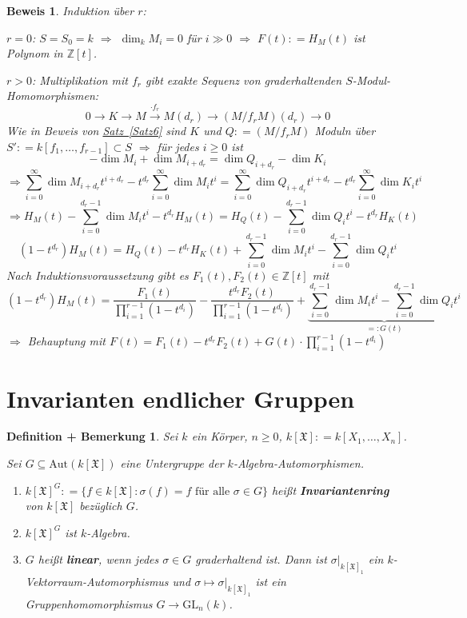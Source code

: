\documentclass[a4paper,12pt]{scrbook}
\theoremstyle{break}
\newtheorem{DefBem}[Def]{Definition + Bemerkung}
\theoremstyle{nonumberbreak}
\newtheorem{Bew}{Beweis}
\theoremstyle{nonumberplain}
\newcommand{\emp}[1]{\textbf{\emph{#1}}}
\newcommand{\defeqr}[0]{\mathrel{\mathop:}=}
\newcommand{\myref}[2]{%
\hyperref[#2]{#1~\ref*{#2}}%
}
\begin{document}
\begin{Bew}
  Induktion über $r$:

  $r=0$: $S = S_0 = k$ $\Rightarrow$ $\dim_k M_i = 0$ für $i \gg 0$
  $\Rightarrow$ $F(t) \defeqr H_M(t)$ ist Polynom in $\mathbb{Z}[t]$.

  $r>0$: Multiplikation mit $f_r$ gibt exakte Sequenz von graderhaltenden
  $S$-Modul-Homomorphismen:
  $$0 \to K \to M \overset{\cdot f_r}{\to} M(d_r) \to (M/f_r M)(d_r) \to 0$$
  Wie in Beweis von \myref{Satz}{Satz6} sind $K$ und $Q \defeqr (M/f_r M)$ Moduln
  über $S' \defeqr k[f_1, \dots, f_{r-1}] \subset S$ $\Rightarrow$ für jedes $i
  \ge 0$ ist
  $$ -\dim M_i + \dim M_{i + d_r} = \dim Q_{i+d_r} - \dim K_i$$
  $$\Rightarrow \sum_{i=0}^{\infty} \dim M_{i+d_r} t^{i+d_r} - t^{d_r}
  \sum_{i=0}^{\infty} \dim M_i t^i = \sum_{i=0}^{\infty} \dim
  Q_{i+d_r} t^{i+d_r} - t^{d_r} \sum_{i=0}^{\infty} \dim K_i t^i$$
  $$\Rightarrow H_M(t) - \sum_{i=0}^{d_r -1} \dim M_i t^i - t^{d_r} H_M(t)
  = H_Q(t) - \sum_{i=0}^{d_r - 1} \dim Q_i t^i - t^{d_r} H_K(t)$$
  $$(1 - t^{d_r})H_M(t) = H_Q(t) - t^{d_r} H_K(t) + \sum_{i=0}^{d_r-1} \dim M_i t^i - \sum_{i=0}^{d_r - 1} \dim Q_i t^i$$
  Nach Induktionsvoraussetzung gibt es $F_1(t), F_2(t) \in \mathbb{Z}[t]$ mit
  $$(1-t^{d_r})H_M(t)= \frac{F_1(t)}{\prod_{i=1}^{r-1}(1-t^{d_i})} - \frac{t^{d_r} F_2(t)}{\prod_{i=1}^{r-1}(1-t^{d_i})} +
  \underbrace{\sum_{i=0}^{d_r-1} \dim M_i t^i - \sum_{i=0}^{d_r - 1} \dim Q_i t^i}_{=: G(t)}$$
  $\Rightarrow$ Behauptung mit $F(t) = F_1(t) - t^{d_r}F_2(t) + G(t)\cdot \displaystyle\prod_{i=1}^{r-1}(1-t^{d_i})$
\end{Bew}
\section{Invarianten endlicher Gruppen}

\begin{DefBem}
\label{2.19}
  Sei $k$ ein Körper, $n \ge 0$, $k[\mathfrak{X}] \defeqr k[X_1, \dots, X_n]$.

  Sei $G \subseteq \mbox{Aut}(k[\mathfrak{X}])$ eine Untergruppe der $k$-Algebra-Automorphismen.
  \begin{enumerate}
    \item $k[\mathfrak{X}]^G \defeqr \{f \in k[\mathfrak{X}]: \sigma (f) = f \mbox{ für alle } \sigma
          \in G\}$ heißt \emp{Invariantenring} von $k[\mathfrak{X}]$
          bezüglich $G$.
    \item $k[\mathfrak{X}]^G$ ist $k$-Algebra.
    \item $G$ heißt \emp{linear}, wenn jedes $\sigma \in G$ graderhaltend ist. Dann
          ist $\sigma|_{k[\mathfrak{X}]_1}$ ein $k$-Vektorraum-Automorphismus und $\sigma \mapsto
          \sigma|_{k[\mathfrak{X}]_1}$ ist ein Gruppenhomomorphismus $G \to \text{GL}_n(k)$.
  \end{enumerate}
\end{DefBem}
\end{document}
